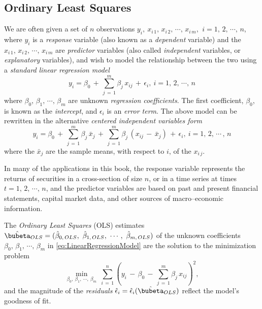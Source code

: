 \documentclass[graybox,envcountchap,sectrefs]{svmono}\usepackage[]{graphicx}\usepackage[]{xcolor}
\begin{document}
\begin{appendices}
\subsection{Ordinary Least Squares}

We are often given a set of $n$ observations $y_{i},\ x_{i\,1},\,x_{i\,2},\,\cdots,\,x_{i\,m},\,\ i=1,\,2,\,\cdots,\,n$,
where $y_{i}$ is a \emph{response} variable (also known as a \emph{dependent}
variable) and the $x_{i\,1},\,x_{i\,2},\,\cdots,\,x_{i\,m}$ are \emph{predictor}
variables (also called \emph{independent} variables, or \emph{explanatory}
variables), and wish to model the relationship between the two using
a \emph{standard} \emph{linear regression model}
\begin{equation}
y_{i}=\beta_{0}\,+\,\sum_{j\,=\,1}^{m}\beta_{j}\,x_{ij}\,+\,\epsilon_{i},\ i=1,\,2,\,\cdots,\,n\label{eq:LinearRegressionModel}
\end{equation}
where $\beta_{0},\,\beta_{1},\,\cdots,\,\beta_{m}$ are unknown \emph{regression
coefficients}. The first coefficient, $\beta_{0}$, is known as the
\emph{intercept}, and $\epsilon_{i}$ is an \emph{error term}. The
above model can be rewritten in the alternative \emph{centered independent
variables form}
\begin{equation}
y_{i}=\beta_{0}\,+\,\sum_{j\,=\,1}^{m}\beta_{j}\,\bar{x}_{j}\,+\,\sum_{j\,=\,1}^{m}\beta_{j}\,\left(x_{ij}\,-\,\bar{x}_{j}\right)\,+\,\epsilon_{i},\ i=1,\,2,\,\cdots\,,\,n
\end{equation}
where the $\bar{x}_{j}$ are the sample means, with respect to $i$,
of the $x_{i\,j}$.

In many of the applications in this book, the response variable represents
the returns of securities in a cross-section of size $n$, or in a
time series at times $t=1,\,2,\,\cdots,\,n$, and the predictor variables
are based on past and present financial statements, capital market
data, and other sources of macro--economic information.

The\emph{ Ordinary Least Squares} (OLS) estimates $\hat{\bubeta}_{OLS}=(\hat{\beta}_{0,\,OLS},\ \hat{\beta}_{1,\,OLS},\ \cdots,\ \hat{\beta}_{m,\,OLS})$
of the unknown coefficients $\beta_{0},\,\beta_{1},\,\cdots,\,\beta_{m}$
in \eqref{eq:LinearRegressionModel} are the solution to the minimization
problem
\begin{equation}
\underset{\beta_{0},\ \beta_{1},\ \cdots,\ \beta_{m}}{\min}\ \sum_{i\,=\,1}^{n}\left(y_{i}\,-\,\beta_{0}\,-\,\sum_{j\,=\,1}^{m}\beta_{j}\,x_{ij}\right)^{2},\label{eq: OLSminimization}
\end{equation}
and the magnitude of the \emph{residuals} $\hat{\epsilon}_{i}=\hat{\epsilon}_{i}(\hat{\bubeta}_{OLS})$
reflect the model's goodness of fit.


\end{appendices}
\end{document}
